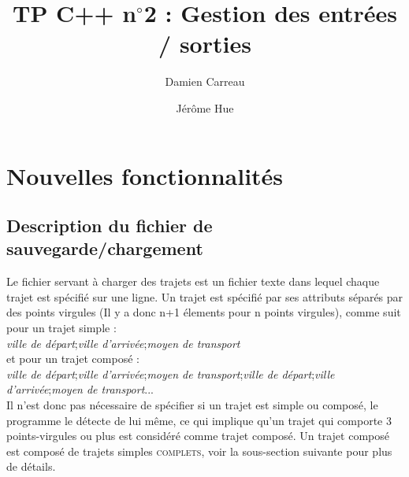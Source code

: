 \documentclass[a4paper]{article}
\title{TP C++ n$^{\circ}$2 : Gestion des entrées / sorties}           %
\author{ Damien Carreau \and Jérôme Hue }
\begin{document}
\maketitle                    %



\tableofcontents              %


\section{Nouvelles fonctionnalités}         %






\subsection{Description du fichier de sauvegarde/chargement}

Le fichier servant à charger des trajets est un fichier texte dans lequel chaque trajet est spécifié sur une ligne. Un trajet est spécifié par ses attributs séparés par des points virgules (Il y a donc n+1 élements pour n points virgules), comme suit pour un trajet simple : \\
\textit{ville de départ};\textit{ville d'arrivée};\textit{moyen de transport} \\
et pour un trajet composé : \\ 
\textit{ville de départ};\textit{ville d'arrivée};\textit{moyen de transport};\textit{ville de départ};\textit{ville d'arrivée};\textit{moyen de transport}... \\
Il n'est donc pas nécessaire de spécifier si un trajet est simple ou composé, le programme le détecte de lui même, ce qui implique qu'un trajet qui comporte 3 points-virgules ou plus est considéré comme trajet composé. Un trajet composé est composé de trajets simples \textsc{complets}, voir la sous-section suivante pour plus de détails.
\end{document}
